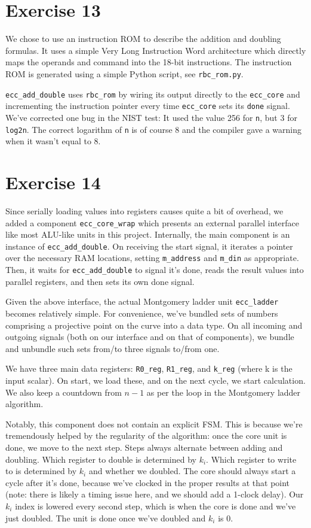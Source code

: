 \documentclass[a4paper,twoside]{article}
\newcommand{\atom}[1]{\mbox{\texttt{#1}}}
\begin{document}
\section*{Exercise 13}
We chose to use an instruction ROM to describe the addition and doubling
formulas. It uses a simple Very Long Instruction Word architecture which
directly maps the operands and command into the 18-bit instructions. The
instruction ROM is generated using a simple Python script, see
\atom{rbc\_rom.py}.

\atom{ecc\_add\_double} uses \atom{rbc\_rom} by wiring its output directly to
the \atom{ecc\_core} and incrementing the instruction pointer every time
\atom{ecc\_core} sets its \atom{done} signal. We've corrected one bug in the
NIST test: It used the value 256 for \atom{n}, but 3 for \atom{log2n}. The
correct logarithm of \atom{n} is of course 8 and the compiler gave a warning
when it wasn't equal to 8.

\section*{Exercise 14}
Since serially loading values into registers causes quite a bit of overhead, we
added a component \atom{ecc\_core\_wrap} which presents an external parallel
interface like most ALU-like units in this project. Internally, the main
component is an instance of \atom{ecc\_add\_double}. On receiving the
start signal, it iterates a pointer over the necessary RAM locations, setting
\atom{m\_address} and \atom{m\_din} as appropriate. Then, it waits for
\atom{ecc\_add\_double} to signal it's done, reads the result values into
parallel registers, and then sets its own done signal.

Given the above interface, the actual Montgomery ladder unit \atom{ecc\_ladder}
becomes relatively simple. For convenience, we've bundled sets of numbers
comprising a projective point on the curve into a data type. On all incoming and
outgoing signals (both on our interface and on that of components), we bundle
and unbundle such sets from/to three signals to/from one.

We have three main data registers: \atom{R0\_reg}, \atom{R1\_reg}, and
\atom{k\_reg} (where k is the input scalar). On start, we load these, and on the
next cycle, we start calculation. We also keep a countdown from $n-1$ as per the
loop in the Montgomery ladder algorithm.

Notably, this component does not contain an explicit FSM. This is because we're
tremendously helped by the regularity of the algorithm: once the core unit is
done, we move to the next step. Steps always alternate between adding and
doubling. Which register to double is determined by $k_i$. Which register to
write to is determined by $k_i$ and whether we doubled. The core should always
start a cycle after it's done, because we've clocked in the proper results at
that point (note: there is likely a timing issue here, and we should add a
1-clock delay). Our $k_i$ index is lowered every second step, which is when the
core is done and we've just doubled. The unit is done once we've doubled and
$k_i$ is 0.
\end{document}

